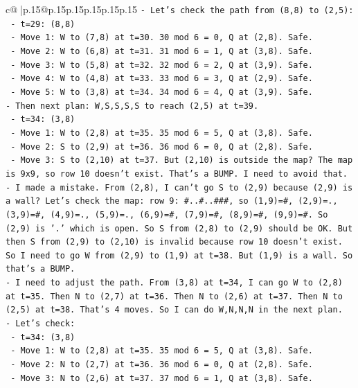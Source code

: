 \documentclass{article}
\begin{document}
{\begin{supertabular}{c@{$\;$}|p{.15\linewidth}@{}p{.15\linewidth}p{.15\linewidth}p{.15\linewidth}p{.15\linewidth}p{.15\linewidth}}
{{{\texttt{{-} Let's check the path from (8,8) to (2,5): } \\
\texttt{  {-} t=29: (8,8)} \\
\texttt{  {-} Move 1: W to (7,8) at t=30. 30 mod 6 = 0, Q at (2,8). Safe.} \\
\texttt{  {-} Move 2: W to (6,8) at t=31. 31 mod 6 = 1, Q at (3,8). Safe.} \\
\texttt{  {-} Move 3: W to (5,8) at t=32. 32 mod 6 = 2, Q at (3,9). Safe.} \\
\texttt{  {-} Move 4: W to (4,8) at t=33. 33 mod 6 = 3, Q at (2,9). Safe.} \\
\texttt{  {-} Move 5: W to (3,8) at t=34. 34 mod 6 = 4, Q at (3,9). Safe.} \\
\texttt{{-} Then next plan: W,S,S,S,S to reach (2,5) at t=39. } \\
\texttt{  {-} t=34: (3,8)} \\
\texttt{  {-} Move 1: W to (2,8) at t=35. 35 mod 6 = 5, Q at (3,8). Safe.} \\
\texttt{  {-} Move 2: S to (2,9) at t=36. 36 mod 6 = 0, Q at (2,8). Safe.} \\
\texttt{  {-} Move 3: S to (2,10) at t=37. But (2,10) is outside the map? The map is 9x9, so row 10 doesn't exist. That's a BUMP. I need to avoid that.} \\
\texttt{{-} I made a mistake. From (2,8), I can't go S to (2,9) because (2,9) is a wall? Let's check the map: row 9: \#..\#..\#\#\#, so (1,9)=\#, (2,9)=., (3,9)=\#, (4,9)=., (5,9)=., (6,9)=\#, (7,9)=\#, (8,9)=\#, (9,9)=\#. So (2,9) is '.' which is open. So S from (2,8) to (2,9) should be OK. But then S from (2,9) to (2,10) is invalid because row 10 doesn't exist. So I need to go W from (2,9) to (1,9) at t=38. But (1,9) is a wall. So that's a BUMP.} \\
\texttt{{-} I need to adjust the path. From (3,8) at t=34, I can go W to (2,8) at t=35. Then N to (2,7) at t=36. Then N to (2,6) at t=37. Then N to (2,5) at t=38. That's 4 moves. So I can do W,N,N,N in the next plan.} \\
\texttt{{-} Let's check: } \\
\texttt{  {-} t=34: (3,8)} \\
\texttt{  {-} Move 1: W to (2,8) at t=35. 35 mod 6 = 5, Q at (3,8). Safe.} \\
\texttt{  {-} Move 2: N to (2,7) at t=36. 36 mod 6 = 0, Q at (2,8). Safe.} \\
\texttt{  {-} Move 3: N to (2,6) at t=37. 37 mod 6 = 1, Q at (3,8). Safe.} \\
}}}
\end{supertabular}}
\end{document}
